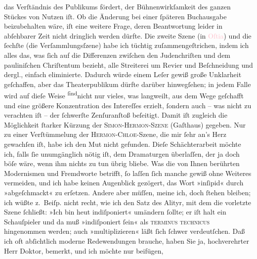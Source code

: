                     das Verſtändnis des Publikums fördert, der Bühnenwirkſamkeit des ganzen Stückes
                    von Nutzen iſt. Ob die Änderung bei einer ſpäteren Buchausgabe beizubehalten
                    wäre, iſt eine weitere Frage, deren Beantwortung leider in abſehbarer Zeit nicht
                    dringlich werden dürfte.\pend
           \pstart
           Die zweite Szene (in \textcolor{pink}{Oſtia}{}\ledrightnote{\textcolor{pink}{Ostia Antica}}) und die ſechſte
                    (die Verſammlungsſzene) habe ich tüchtig zuſammengeſtrichen, indem ich alles
                    das, was ſich auf die Differenzen zwiſchen den Judenchriſten und dem
                    pauliniſchen Chriſtentum bezieht, alle Streiterei um Revier und Beſchneidung und
                    dergl., einfach eliminierte. Dadurch würde einem Leſer gewiß große Unklarheit
                    geſchaffen, aber das Theaterpublikum dürfte darüber hinwegſehen; in jedem Falle
                    wird auf dieſe Weise \substVorne{}\textsuperscript{ſind}\substDazwischen{}nicht\substHinten{} nur vieles, was langweilt, aus dem Wege geſchafft und eine größere
                    Konzentration des Intereſſes erzielt, ſondern auch – {\pb}was nicht zu verachten iſt – der
                    ſchwerſte Zenſuranſtoß beſeitigt. Damit iſt zugleich die Möglichkeit ſtarker
                    Kürzung der \textsc{Simon-Hermon-Szene} (Gaſthaus) gegeben. Nur
                    zu einer Verſtümmelung der \textsc{Hermon-Chloe}-Szene, die mir
                    ſehr an’s Herz gewachſen iſt, habe ich den Mut nicht gefunden. Dieſe
                    Schächterarbeit möchte ich, falls ſie unumgänglich nötig iſt, dem Dramaturgen
                    überlaſſen, der ja doch böſe wäre, wenn ihm nichts zu tun übrig bliebe.\pend
           \pstart
           Was die von Ihnen berührten Modernismen und Fremdworte betrifft, ſo laſſen ſich
                    manche gewiß ohne Weiteres vermeiden, und ich habe keinen Augenblick gezögert,
                    das Wort »inſipid« durch »abgeſchmackt« zu erſetzen. Andere aber müſſen, meine
                    ich, doch ſtehen bleiben; ich wüßte z. Beiſp. nicht recht, wie ich den Satz des
                    Alityr, mit dem die vorletzte Szene ſchließt: »Ich bin heut indiſponiert«
                    umändern ſollte; er iſt halt ein Schauſpieler und da muß »indiſponiert ſein« als
                        \textsc{terminus technicus} hingenommen werden; auch
                    »multiplizieren« läßt ſich ſchwer verdeutſchen. Daß ich oft abſichtlich moderne
                    Redewendungen brauche, haben Sie ja, hochverehrter Herr Doktor, be{\pb}merkt, und ich möchte nur beifügen,
